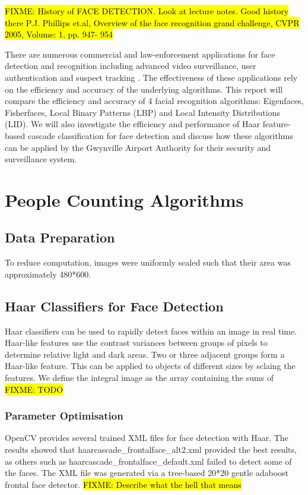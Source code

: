 \documentclass{article}
\begin{document}
\hl{FIXME: History of FACE DETECTION. Look at lecture notes. Good history there P.J. Phillips et.al, Overview of the face recognition grand challenge, CVPR 2005, Volume: 1, pp. 947- 954 }

There are numerous commercial and law-enforcement applications for face detection and recognition including advanced video surveillance, user authentication and suspect tracking \cite{zhao2003face}. The effectiveness of these applications rely on the efficiency and accuracy of the underlying algorithms. This report will compare the efficiency and accuracy of 4 facial recognition algorithms: Eigenfaces, Fisherfaces, Local Binary Patterns (LBP) and Local Intensity Distributions (LID). We will also investigate the efficiency and performance of Haar feature-based cascade classification for face detection and discuss how these algorithms can be applied by the Gwynville Airport Authority for their security and surveillance system.



\section{People Counting Algorithms}
\subsection{Data Preparation}
To reduce computation, images were uniformly scaled such that their area was approximately 480*600.

\subsection{Haar Classifiers for Face Detection}
Haar classifiers can be used to rapidly detect faces within an image in real time. Haar-like features use the contrast variances between groups of pixels to determine relative light and dark areas. Two or three adjacent groups form a Haar-like feature. This can be applied to objects of different sizes by sclaing the features.
We define the integral image as the array containing the sums of \hl{FIXME: TODO}

\subsubsection{Parameter Optimisation}
OpenCV provides several trained XML files for face detection with Haar. The results showed that haarcascade\_frontalface\_alt2.xml provided the best results, as others such as haarcascade\_frontalface\_default.xml failed to detect some of the faces. The XML file was generated via a tree-based 20*20 gentle adaboost frontal face detector. \hl{FIXME: Describe what the hell that means}
\end{document}

